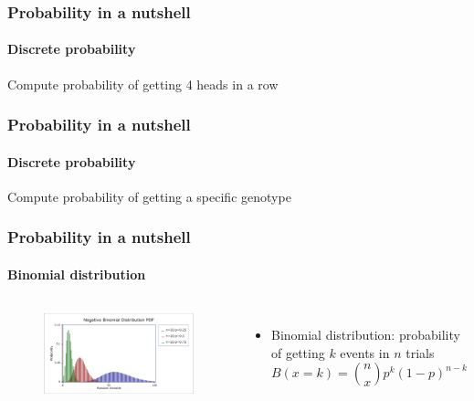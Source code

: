 \documentclass[aspectratio=43]{beamer}
\begin{document}
\begin{frame}

	\frametitle{Probability in a nutshell}
	\framesubtitle{Discrete probability}
	
	\footnotesize
	
	Compute probability of getting 4 heads in a row

\end{frame}

\begin{frame}
	
	\frametitle{Probability in a nutshell}
	\framesubtitle{Discrete probability}
	
	\footnotesize
	
	Compute probability of getting a specific genotype

\end{frame}

\begin{frame}
	
	\frametitle{Probability in a nutshell}
	\framesubtitle{Binomial distribution}
	
	\footnotesize
	
	\begin{columns}	
		
		
		\begin{figure}
			\includegraphics[width = 5 cm]{plots/part1/binomial.png}
		\end{figure}
		
		
		\begin{itemize}
			\item Binomial distribution: probability of getting $k$ events in $n$ trials
			\begin{equation}
				B(x = k) = {n \choose x} p^{k}(1-p)^{n-k} \nonumber
			\end{equation}
		\end{itemize}
		
	\end{columns}

\end{frame}
\end{document}
